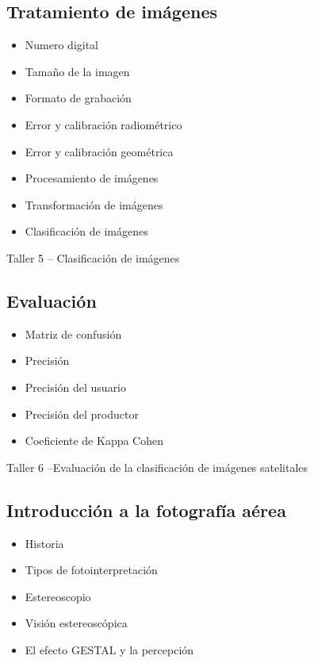 \documentclass[a4paper,twoside,11pt,]{article}
\begin{document}
\subsection {Tratamiento de imágenes}
\begin{itemize}
\item Numero digital
\item Tamaño de la imagen
\item Formato de grabación
\item Error y calibración radiométrico
\item Error y calibración geométrica
\item Procesamiento de imágenes
\item Transformación de imágenes
\item Clasificación de imágenes
\end{itemize}

\begin{tcolorbox}[enhanced,width=5in,center upper,  fontupper=\large\bfseries,drop shadow southwest,sharp corners]
Taller 5 -- Clasificación de imágenes
\end{tcolorbox}

\subsection {Evaluación}
\begin{itemize}
\item Matriz de confusión
\item Precisión
\item Precisión del usuario
\item Precisión del productor
\item Coeficiente de Kappa Cohen
\end{itemize}

\begin{tcolorbox}[enhanced,width=5in,center upper,  fontupper=\large\bfseries,drop shadow southwest,sharp corners]
Taller 6 --Evaluación de la clasificación de imágenes satelitales
\end{tcolorbox}

\subsection {Introducción a la fotografía aérea}
\begin{itemize}
\item Historia
\item Tipos de fotointerpretación
\item Estereoscopio
\item Visión estereoscópica
\item El efecto GESTAL y la percepción
\end{itemize}
\end{document}
